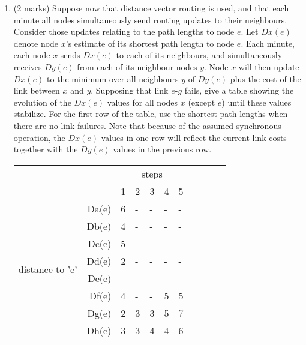 \documentclass[10pt]{amsart}
\begin{document}
\begin{enumerate}
\begin{enumerate}
        \item (2 marks) Suppose now that distance vector routing is used, and
            that each minute all nodes simultaneously send routing updates to
            their neighbours. Consider those updates relating to the path
            lengths to node $e$. Let $Dx(e)$ denote node $x$'s estimate of its
            shortest path length to node $e$. Each minute, each node $x$ sends
            $Dx(e)$ to each of its neighbours, and simultaneously receives
            $Dy(e)$ from each of its neighbour nodes $y$. Node $x$ will then
            update $Dx(e)$ to the minimum over all neighbours $y$ of $Dy(e)$
            plus the cost of the link between $x$ and $y$. Supposing that link
            $e$-$g$ fails, give a table showing the evolution of the $Dx(e)$
            values for all nodes $x$ (except $e$) until these values stabilize.
            For the first row of the table, use the shortest path lengths when
            there are no link failures. Note that because of the assumed
            synchronous operation, the $Dx(e)$ values in one row will reflect
            the current link costs together with the $Dy(e)$ values in the
            previous row.\\
            \begin{tabular}{|lr|l|l|l|l|l|l|l|l|l|} \cline{3-7}
            \multicolumn{1}{l}{} && \multicolumn{5}{c|}{steps} \\ \cline{3-7}
                \multicolumn{1}{l}{} & & 1 & 2 & 3 & 4 & 5 \\ \hline
            \multirow{8}{*}{\begin{sideways}distance to 'e'\end{sideways}}
                & \multicolumn{1}{|r|}{Da(e)} & 6 & - & - & - & - \\ \cline{2-7}
                & \multicolumn{1}{|r|}{Db(e)} & 4 & - & - & - & - \\ \cline{2-7}
                & \multicolumn{1}{|r|}{Dc(e)} & 5 & - & - & - & - \\ \cline{2-7}
                & \multicolumn{1}{|r|}{Dd(e)} & 2 & - & - & - & - \\ \cline{2-7}
                & \multicolumn{1}{|r|}{De(e)} & - & - & - & - & - \\ \cline{2-7}
                & \multicolumn{1}{|r|}{Df(e)} & 4 & - & - & 5 & 5 \\ \cline{2-7}
                & \multicolumn{1}{|r|}{Dg(e)} & 2 & 3 & 3 & 5 & 7 \\ \cline{2-7}
                & \multicolumn{1}{|r|}{Dh(e)} & 3 & 3 & 4 & 4 & 6 \\ \hline
            \end{tabular}

    \end{enumerate}
\end{enumerate}
\end{document}
